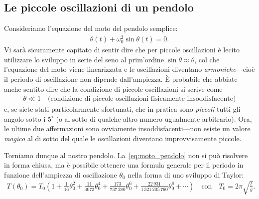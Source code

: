 \subsection{Le piccole oscillazioni di un pendolo}
\label{sec:piccole_oscillazioni}

Consideriamo l'equazione del moto del pendolo semplice:
\begin{align}\label{eq:moto_pendolo}
  \ddot\theta(t) + \omega_0^2\sin\theta(t) = 0.
\end{align}
Vi sarà sicuramente capitato di sentir dire che per piccole oscillazioni è
lecito utilizzare lo sviluppo in serie del seno al prim'ordine
$\sin\theta \approx \theta$, col che l'equazione del moto viene linearizzata
e le oscillazioni diventano \emph{armoniche}---cioè il periodo di oscillazione
non dipende dall'ampiezza.  \`E probabile che abbiate anche sentito dire che
la condizione di piccole oscillazioni si scrive come
\begin{align*}
  \theta \ll 1 \quad
  \text{(condizione di piccole oscillazioni fisicamente insoddisfacente)}
\end{align*}
e, se siete stati particolarmente sfortunati, che in pratica sono \emph{piccoli}
tutti gli angolo sotto i $5^\circ$ (o al sotto di qualche altro numero
ugualmente arbitrario). Ora, le ultime due affermazioni sono ovviamente
insoddisfacenti---non esiste un valore \emph{magico} al di sotto del quale le
oscillazioni diventano improvvisamente piccole.

Torniamo dunque al nostro pendolo. La~\eqref{eq:moto_pendolo} non si può
risolvere in forma chiusa, ma è possibile ottenere una formula generale
per il periodo in funzione dell'ampiezza di oscillazione $\theta_0$ nella forma
di uno sviluppo di Taylor:
\begin{align}\label{eq:periodo_pendolo_theta}
  T(\theta_0) = T_0 \left( 1 + \frac{1}{16}\theta_0^2 +
  \frac{11}{3072}\theta_0^4 + \frac{173}{737\,280}\theta_0^6 +
  \frac{22\,931}{1\,321\,205\,760}\theta_0^8 +
  \cdots \right) \quad \text{con} \quad
  T_0 = 2\pi\sqrt{\frac{l}{g}}.
\end{align}


